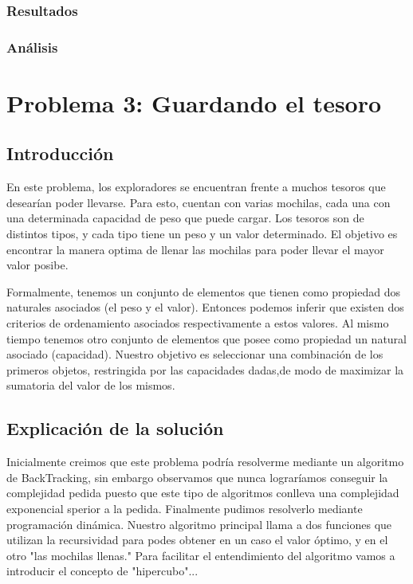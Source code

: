 \documentclass[spanish,12pt]{article}
\begin{document}
\subsubsection{Resultados}

\subsubsection{Análisis}





\section{Problema 3: Guardando el tesoro}

\subsection{Introducción}

En este problema, los exploradores se encuentran frente a muchos tesoros que desearían poder llevarse. Para esto, cuentan con varias mochilas, cada una con una determinada capacidad de peso que puede cargar.
Los tesoros son de distintos tipos, y cada tipo tiene un peso y un valor determinado.
El objetivo es encontrar la manera optima de llenar las mochilas para poder llevar el mayor valor posibe.

Formalmente, tenemos un conjunto de elementos que tienen como propiedad dos naturales asociados (el peso y el valor). Entonces podemos inferir que existen dos criterios de ordenamiento asociados respectivamente a estos valores.
Al mismo tiempo tenemos otro conjunto de elementos que posee como propiedad un natural asociado (capacidad).
Nuestro objetivo es seleccionar una combinación de los primeros objetos, restringida por las capacidades dadas,de modo de maximizar la sumatoria del valor de los mismos.


\subsection{Explicación de la solución}

   Inicialmente creimos que este problema podría resolverme mediante un algoritmo de BackTracking, sin embargo observamos que nunca lograríamos conseguir la complejidad pedida puesto que este tipo de algoritmos conlleva una complejidad exponencial sperior a la pedida.
   Finalmente pudimos resolverlo mediante programación dinámica. Nuestro algoritmo principal llama a dos funciones que utilizan la recursividad para podes obtener en un caso el valor óptimo, y en el otro "las mochilas llenas."
   Para facilitar el entendimiento del algoritmo vamos a introducir el concepto de "hipercubo"...%
\end{document}
